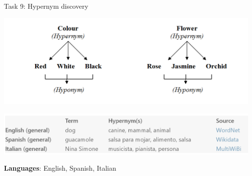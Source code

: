 \documentclass[10pt, compress]{beamer}
\begin{document}
\begin{frame}{Task 9: Hypernym discovery}

\begin{center}
\includegraphics[width=\textwidth]{graphics/hypernymy.png}
\end{center}

\begin{center}
\includegraphics[width=\textwidth]{graphics/hypernyms-examples.png}
\end{center}

\textbf{Languages}: English, Spanish, Italian

\end{frame}
\end{document}
